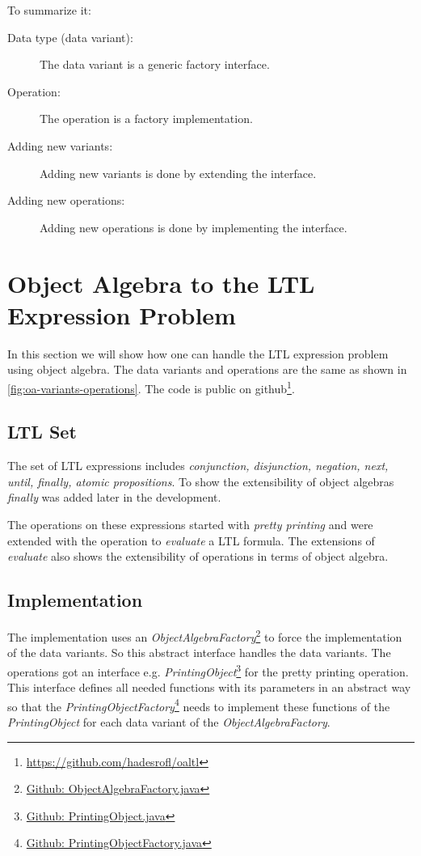 \documentclass{llncs}
\begin{document}
To summarize it:

\begin{description}
	\item[Data type (data variant):] The data variant is a generic factory interface.
	\item[Operation:] The operation is a factory implementation.
	\item[Adding new variants: ] Adding new variants is done by extending the interface.
	\item[Adding new operations:] Adding new operations is done by implementing the interface.
\end{description}


\section{Object Algebra to the LTL Expression Problem} \label{sec:oa-ltl}
In this section we will show how one can handle the LTL expression problem using object algebra. The data variants and operations are the same as shown in \autoref{fig:oa-variants-operations}. The code is public on github\footnote{\href{https://github.com/hadesrofl/oaltl}{https://github.com/hadesrofl/oaltl}}.

\subsection{LTL Set} \label{ssec:ltl-set}
The set of LTL expressions includes \emph{conjunction, disjunction, negation, next, until, finally, atomic propositions}. To show the extensibility of object algebras \emph{finally} was added later in the development.

The operations on these expressions started with \emph{pretty printing} and were extended with the operation to \emph{evaluate} a LTL formula. The extensions of \emph{evaluate} also shows the extensibility of operations in terms of object algebra.

\subsection{Implementation} \label{ssec:implementation}
The implementation uses an \emph{ObjectAlgebraFactory}\footnote{\href{https://github.com/hadesrofl/oaltl/blob/develop/src/main/java/de/uzl/hsr/oaltl/ObjectAlgebraFactory.java}{Github: ObjectAlgebraFactory.java}} to force the implementation of the data variants. So this abstract interface handles the data variants. The operations got an interface e.g. \emph{PrintingObject}\footnote{\href{https://github.com/hadesrofl/oaltl/blob/develop/src/main/java/de/uzl/hsr/oaltl/PrintingObject.java}{Github: PrintingObject.java}} for the pretty printing operation. This interface defines all needed functions with its parameters in an abstract way so that the \emph{PrintingObjectFactory}\footnote{\href{https://github.com/hadesrofl/oaltl/blob/develop/src/main/java/de/uzl/hsr/oaltl/PrintingObjectFactory.java}{Github: PrintingObjectFactory.java}} needs to implement these functions of the \emph{PrintingObject} for each data variant of the \emph{ObjectAlgebraFactory}. 
\end{document}
